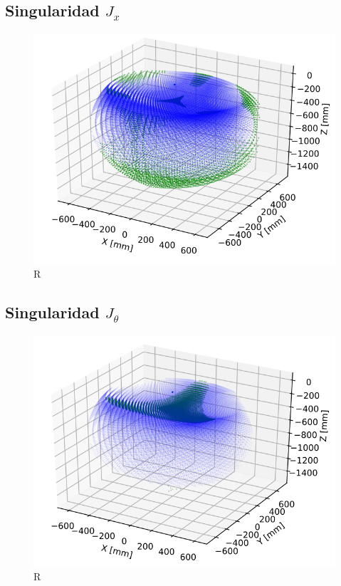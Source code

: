     \subsection{Singularidad $J_{x}$}
        \begin{figure}[h]
            \centering
            \includegraphics[width=0.65\linewidth]{Main/Chapter7/Images7/ws_4.png}
            \caption{R}
            \label{f:cap7_ws4}
        \end{figure}  
    
    \subsection{Singularidad $J_{\theta}$}
        \begin{figure}[h]
            \centering
            \includegraphics[width=0.65\linewidth]{Main/Chapter7/Images7/ws_5.png}
            \caption{R}
            \label{f:cap7_ws5}
        \end{figure}  
        
    \newpage
    


